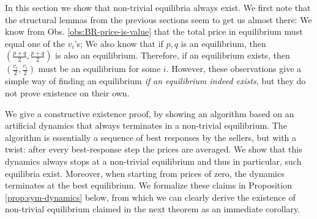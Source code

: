 

In this section we show that non-trivial equilibria always exist.
We first note that the structural lemmas from the previous sections seem to get us almost there:
We know from Obs. \ref{obs:BR-price-is-value} that the total price in equilibrium must equal one of the $v_i$'s; We also know that if $p,q$ is an equilibrium, then $(\frac{p+q}{2},\frac{p+q}{2})$ is also an equilibrium.
Therefore, if an equilibrium exists, then $(\frac{v_i}{2},\frac{v_i}{2})$ must be an equilibrium for some $i$.
However, these observations give a simple way of finding an equilibrium {\em if an equilibrium indeed exists}, but  they do not prove existence on their own.

We give a constructive existence proof, by showing an algorithm based on an artificial dynamics that always terminates in a non-trivial equilibrium. The algorithm is essentially a sequence of best responses by the sellers, but with a twist: after every best-response step the prices are averaged.
We show that this dynamics always stops at a non-trivial equilibrium and thus in particular, such equilibria exist.
Moreover, when starting from prices of zero, the dynamics terminates at the best equilibrium.
We formalize these claims in Proposition \ref{prop:sym-dynamics} below, from which we can clearly derive the existence of non-trivial equilibrium claimed in the next theorem as an immediate corollary.




